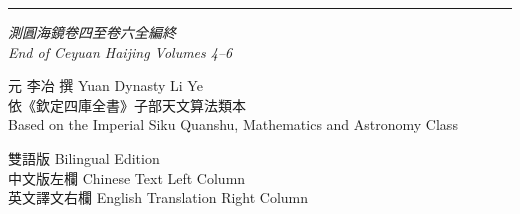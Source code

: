 \documentclass[9pt,a4paper]{article}
\begin{document}
\vspace{1cm}
\begin{center}
\rule{0.3\textwidth}{0.4pt}

\vspace{0.3cm}

{\large\itshape 測圓海鏡卷四至卷六全編終}\\[0.2cm]
{\large\itshape End of Ceyuan Haijing Volumes 4--6}

\vspace{0.3cm}

{\small 元 \quad 李冶 \quad 撰 \quad Yuan Dynasty \quad Li Ye}\\[0.1cm]

{\small\color{notecolor} 依《欽定四庫全書》子部天文算法類本}\\[0.05cm]
{\small\color{notecolor} Based on the Imperial Siku Quanshu, Mathematics and Astronomy Class}

\vspace{0.3cm}

{\small 雙語版 \quad Bilingual Edition}\\[0.1cm]
{\small\color{notecolor} 中文版左欄 \quad Chinese Text Left Column}\\[0.05cm]
{\small\color{notecolor} 英文譯文右欄 \quad English Translation Right Column}

\end{center}
\end{document}
